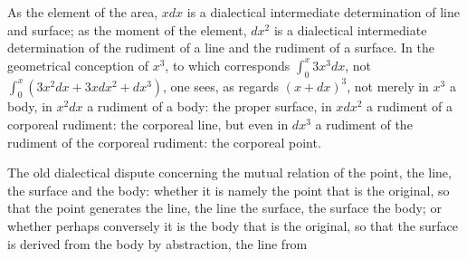 \documentclass[12pt,a4paper,openany]{book}
\newcommand{\opage}[1]{\marginnote{\footnotesize\textit{[#1]}}}
\begin{document}
\setcounter{footnote}{0}%
\opage{108}As the element of the area, $xdx$ is a dialectical intermediate determination
of line and surface; as the moment of the element, $dx^{2}$ is a dialectical intermediate determination of the rudiment of a line
and the rudiment of a surface. In the geometrical conception of $x^{3}$, to which corresponds $\int_{0}^{x}3x^{3}dx$, not $\int_{0}^{x}(3x^{2}dx+3xdx^{2}+dx^{3})$, %
one sees, as regards $(x+dx)^{3}$, not merely in $x^{3}$ a body, in
$x^{2}dx$ a rudiment of a body: the proper surface, in $xdx^{2}$
a rudiment of a corporeal rudiment: the corporeal line, but
even in $dx^{3}$ a rudiment of the rudiment of the corporeal rudiment: the
corporeal point.

The old dialectical dispute concerning the mutual relation of the point, the line,
the surface and the body: whether
it is namely the point that is the original, so that the point
generates the line, the line the surface, the surface the body; or
whether perhaps conversely it is the body that is the original, so
that the surface is derived from the body by abstraction, the line from
\end{document}
